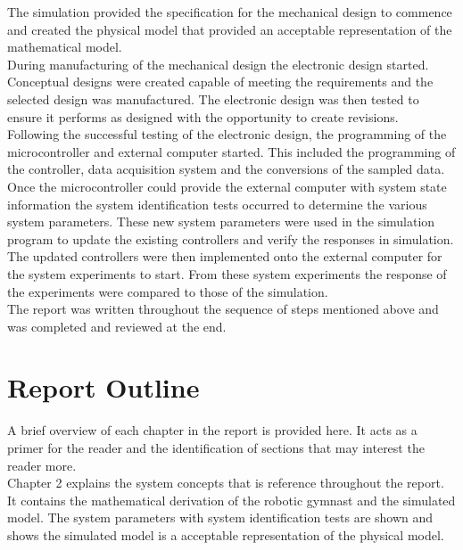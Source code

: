 The simulation provided the specification for the mechanical design to commence and created the physical model that provided an acceptable representation of the mathematical model.\\

During manufacturing of the mechanical design the electronic design started. Conceptual designs were created capable of meeting the requirements and the selected design was manufactured. The electronic design was then tested to ensure it performs as designed with the opportunity to create revisions.\\

Following the successful testing of the electronic design, the programming of the microcontroller and external computer started. This included the programming of the controller, data acquisition system and the conversions of the sampled data.\\

Once the microcontroller could provide the external computer with system state information the system identification tests occurred to determine the various system parameters. These new system parameters were used in the simulation program to update the existing controllers and verify the responses in simulation.\\

The updated controllers were then implemented onto the external computer for the system experiments to start. From these system experiments the response of the experiments were compared to those of the simulation.\\

The report was written throughout the sequence of steps mentioned above and was completed and reviewed at the end.


\section{Report Outline}

A brief overview of each chapter in the report is provided here. It acts as a primer for the reader and the identification of sections that may interest the reader more.\\

Chapter 2 explains the system concepts that is reference throughout the report. It contains the mathematical derivation of the robotic gymnast and the simulated model. The system parameters with system identification tests are shown and shows the simulated model is a acceptable representation of the physical model.\\


